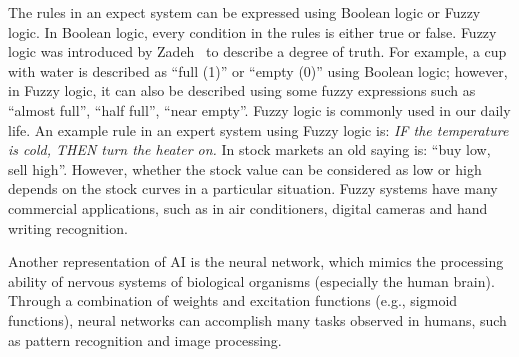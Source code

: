 The rules in an expect system can be expressed using Boolean logic or Fuzzy logic. In Boolean logic, every condition in the rules is either true or false. Fuzzy logic was introduced by Zadeh~\cite{Zadeh:IC:1965} to describe a degree of truth. For example, a cup with water is described as ``full (1)'' or ``empty (0)'' using Boolean logic; however, in Fuzzy logic, it can also be described using some fuzzy expressions such as ``almost full'', ``half full'', ``near empty''. Fuzzy logic is commonly used in our daily life. An example rule in an expert system using Fuzzy logic is: \textit{IF the temperature is cold, THEN turn the heater on.} In stock markets an old saying is: ``buy low, sell high''. However, whether the stock value can be considered as low or high depends on the stock curves in a particular situation. Fuzzy systems have many commercial applications, such as in air conditioners, digital cameras and hand writing recognition. 

Another representation of AI is the neural network, which mimics the processing ability of nervous systems of biological organisms (especially the human brain). Through a combination of weights and excitation functions (e.g., sigmoid functions), neural networks can accomplish many tasks observed in humans, such as pattern recognition and image processing. 



